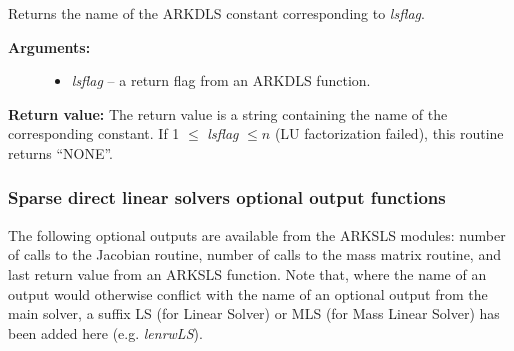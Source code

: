 \documentclass[letterpaper,10pt,english]{sphinxmanual}
\begin{document}
\begin{fulllineitems}
\label{c_interface/User_callable:ARKDlsGetReturnFlagName}
Returns the name of the ARKDLS constant
corresponding to \emph{lsflag}.
\begin{description}
\item[{\textbf{Arguments:}}] \leavevmode\begin{itemize}
\item {} 
\emph{lsflag} -- a return flag from an ARKDLS function.

\end{itemize}

\end{description}

\textbf{Return value:}  The return value is a string containing the name of
the corresponding constant. If 1 $\le$ \emph{lsflag} $\le
n$ (LU factorization failed), this routine returns ``NONE''.

\end{fulllineitems}



\subsubsection{Sparse direct linear solvers optional output functions}
\label{c_interface/User_callable:sparse-direct-linear-solvers-optional-output-functions}\label{c_interface/User_callable:cinterface-arkslsoutputs}
The following optional outputs are available from the ARKSLS
modules: number of calls to the Jacobian
routine, number of calls to the mass matrix routine, and last return
value from an ARKSLS function.  Note that, where the name of an output
would otherwise conflict with the name of an optional output from the
main solver, a suffix LS (for Linear Solver) or MLS (for Mass Linear
Solver) has been added here (e.g. \emph{lenrwLS}).
\end{document}
